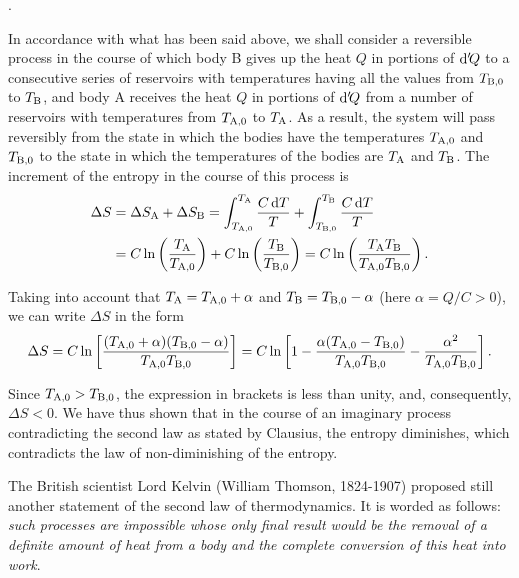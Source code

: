 .

In accordance with what has been said above, we shall consider a reversible process in the course of which body B gives up the heat $Q$ in portions of $\mathrm{d}'\!Q$ to a consecutive series of reservoirs with temperatures having all the values from $T_{\text{B,$0$}}$ to $T_{\text{B}}$, and body A receives the heat $Q$ in portions of $\mathrm{d}'\!Q$ from a number of reservoirs with temperatures from $T_{\text{A,$0$}}$ to $T_{\text{A}}$. As a result, the system will pass reversibly from the state in which the bodies have the temperatures $T_{\text{A,$0$}}$ and $T_{\text{B,$0$}}$ to the state in which the temperatures of the bodies are $T_{\text{A}}$ and $T_{\text{B}}$. The increment of the entropy in the course of this process is
\begin{align*}
	\Delta S &= \Delta S_{\text{A}} + \Delta S_{\text{B}} = \int_{T_{\text{A,$0$}}}^{T_{\text{A}}} \frac{C\,\mathrm{d} T}{T} + \int_{T_{\text{B,$0$}}}^{T_{\text{B}}} \frac{C\,\mathrm{d} T}{T}\\
	&= C\ln\left(\frac{T_{\text{A}}}{T_{\text{A,$0$}}}\right) + C\ln\left(\frac{T_{\text{B}}}{T_{\text{B,$0$}}}\right) = C\ln\left(\frac{T_{\text{A}}T_{\text{B}}}{T_{\text{A,$0$}}T_{\text{B,$0$}}}\right).
\end{align*}

\noindent
Taking into account that $T_{\text{A}}=T_{\text{A,$0$}}+\alpha$ and $T_{\text{B}}=T_{\text{B,$0$}}-\alpha$ (here $\alpha=Q/C>0$), we can write $\Delta S$ in the form
\begin{equation*}
	\Delta S = C\ln\left[\frac{(T_{\text{A,$0$}}+\alpha)(T_{\text{B,$0$}}-\alpha)}{T_{\text{A,$0$}}T_{\text{B,$0$}}}\right] = C\ln\left[1 - \frac{\alpha (T_{\text{A,$0$}} - T_{\text{B,$0$}})}{T_{\text{A,$0$}}T_{\text{B,$0$}}} - \frac{\alpha^2}{T_{\text{A,$0$}}T_{\text{B,$0$}}}\right].
\end{equation*}

\noindent
Since $T_{\text{A,$0$}}>T_{\text{B,$0$}}$, the expression in brackets is less than unity, and, consequently, $\Delta S<0$. We have thus shown that in the course of an imaginary process contradicting the second law as stated by Clausius, the entropy diminishes, which contradicts the law of non-diminishing of the entropy.

The British scientist Lord Kelvin (William Thomson, 1824-1907) proposed still another statement of the second law of thermodynamics. It is worded as follows: \textit{such processes are impossible whose only final result would be the removal of a definite amount of heat from a body and the complete conversion of this heat into work}.


